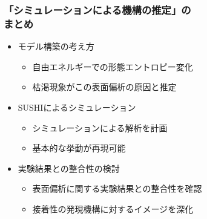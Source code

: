 \documentclass[unicode,12pt]{beamer}%
\begin{document}
\begin{frame}
	\frametitle{「シミュレーションによる機構の推定」の\\まとめ}
        \begin{boxnote}
            \vspace{-3mm}
            \begin{itemize}
                \item モデル構築の考え方
                    \begin{itemize}
						\item 自由エネルギーでの形態エントロピー変化
                        \item 枯渇現象がこの表面偏析の原因と推定
                    \end{itemize} 
                \item SUSHIによるシミュレーション
                    \begin{itemize}
                        \item シミュレーションによる解析を計画
                        \item 基本的な挙動が再現可能
                    \end{itemize} 
                \item 実験結果との整合性の検討
                    \begin{itemize}
                        \item 表面偏析に関する実験結果との整合性を確認
                        \item 接着性の発現機構に対するイメージを深化
                    \end{itemize}
            \end{itemize}
        \end{boxnote}
\end{frame}






%

\end{document}
